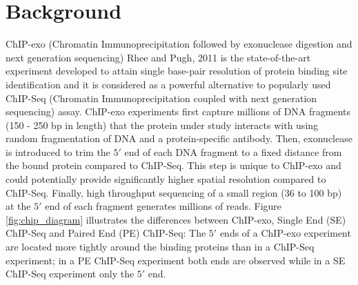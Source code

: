 \documentclass{bmcart}\usepackage[]{graphicx}\usepackage[]{color}
\begin{document}
\newpage

\section{Background}
\label{sec:intro}

ChIP-exo (Chromatin Immunoprecipitation followed by exonuclease
digestion and next generation sequencing) Rhee and Pugh, 2011
\cite{exo1} is the state-of-the-art experiment developed to attain
single base-pair resolution of protein binding site identification and
it is considered as a powerful alternative to popularly used ChIP-Seq
(Chromatin Immunoprecipitation coupled with next generation
sequencing) assay. ChIP-exo experiments first capture millions of DNA
fragments (150 - 250 bp in length) that the protein under study
interacts with using random fragmentation of DNA and a
protein-specific antibody. Then, exonuclease is introduced to trim the
$5\prime$ end of each DNA fragment to a fixed distance from the bound
protein compared to ChIP-Seq. This step is unique to ChIP-exo and
could potentially provide significantly higher spatial resolution
compared to ChIP-Seq. Finally, high throughput sequencing of a small
region (36 to 100 bp) at the $5\prime$ end of each fragment generates
millions of reads. Figure \ref{fig:chip_diagram} illustrates the
differences between ChIP-exo, Single End (SE) ChIP-Seq and Paired End
(PE) ChIP-Seq: The $5\prime$ ends of a ChIP-exo experiment are located
more tightly around the binding proteins than in a ChIP-Seq
experiment; in a PE ChIP-Seq experiment both ends are observed while
in a SE ChIP-Seq experiment only the $5\prime$ end.

\end{document}
